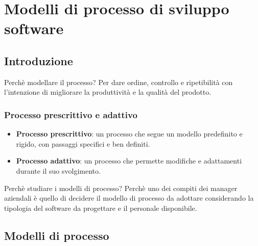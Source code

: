\documentclass[12pt, a4paper]{report}
\begin{document}
\newpage
\tableofcontents
\chapter{Modelli di processo di sviluppo software}
\section{Introduzione}
Perchè modellare il processo? Per dare ordine, controllo e ripetibilità con l'intenzione di migliorare la produttività e la qualità del prodotto.
\subsection{Processo prescrittivo e adattivo}
\begin{itemize}
    \item \textbf{Processo prescrittivo}: un processo che segue un modello predefinito e rigido, con passaggi specifici e ben definiti.
    \item \textbf{Processo adattivo}: un processo che permette modifiche e adattamenti durante il suo svolgimento.
\end{itemize}
Perchè studiare  i modelli di processo? Perchè uno dei compiti dei manager aziendali è quello di decidere il modello di processo da adottare considerando la tipologia del software da progettare e il personale disponibile.
\section{Modelli di processo}
\end{document}
